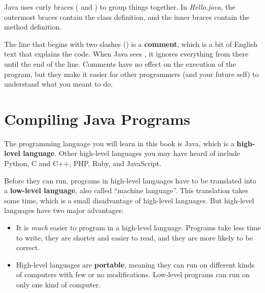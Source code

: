 Java uses curly braces (\java{\{} and \java{\}}) to group things together.
In {\it Hello.java}, the outermost braces contain the class definition, and the inner braces contain the method definition.


The line that begins with two slashes (\java{//}) is a {\bf comment}, which is a bit of English text that explains the code.
When Java sees \java{//}, it ignores everything from there until the end of the line.
Comments have no effect on the execution of the program, but they make it easier for other programmers (and your future self) to understand what you meant to do.


\section{Compiling Java Programs}
\label{computer-programming_compiling-java-programs}


The programming language you will learn in this book is Java, which is a {\bf high-level language}.
Other high-level languages you may have heard of include Python, C and C++, PHP, Ruby, and JavaScript.


Before they can run, programs in high-level languages have to be translated into a {\bf low-level language}, also called ``machine language''.
This translation takes some time, which is a small disadvantage of high-level languages.
But high-level languages have two major advantages:

\begin{itemize}

\item It is {\em much} easier to program in a high-level language.
Programs take less time to write, they are shorter and easier to read, and they are more likely to be correct.


\item High-level languages are {\bf portable}, meaning they can run on different kinds of computers with few or no modifications.
Low-level programs can run on only one kind of computer. %

\end{itemize}


